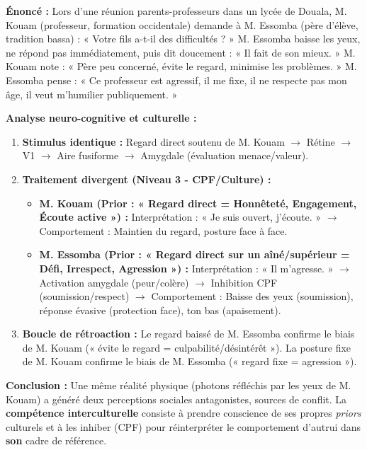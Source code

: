 \documentclass[11pt]{article}
\begin{document}
\begin{exoresolu}
\textbf{Énoncé :} Lors d'une réunion parents-professeurs dans un lycée de Douala, M. Kouam (professeur, formation occidentale) demande à M. Essomba (père d'élève, tradition bassa) : « Votre fils a-t-il des difficultés ? » M. Essomba baisse les yeux, ne répond pas immédiatement, puis dit doucement : « Il fait de son mieux. » M. Kouam note : « Père peu concerné, évite le regard, minimise les problèmes. » M. Essomba pense : « Ce professeur est agressif, il me fixe, il ne respecte pas mon âge, il veut m'humilier publiquement. »

\textbf{Analyse neuro-cognitive et culturelle :}
\begin{enumerate}
    \item \textbf{Stimulus identique :} Regard direct soutenu de M. Kouam $\to$ Rétine $\to$ V1 $\to$ Aire fusiforme $\to$ Amygdale (évaluation menace/valeur).
    \item \textbf{Traitement divergent (Niveau 3 - CPF/Culture) :}
    \begin{itemize}
        \item \textbf{M. Kouam (Prior : « Regard direct = Honnêteté, Engagement, Écoute active ») :} Interprétation : « Je suis ouvert, j'écoute. » $\to$ Comportement : Maintien du regard, posture face à face.
        \item \textbf{M. Essomba (Prior : « Regard direct sur un aîné/supérieur = Défi, Irrespect, Agression ») :} Interprétation : « Il m'agresse. » $\to$ Activation amygdale (peur/colère) $\to$ Inhibition CPF (soumission/respect) $\to$ Comportement : Baisse des yeux (soumission), réponse évasive (protection face), ton bas (apaisement).
    \end{itemize}
    \item \textbf{Boucle de rétroaction :} Le regard baissé de M. Essomba confirme le biais de M. Kouam (« évite le regard = culpabilité/désintérêt »). La posture fixe de M. Kouam confirme le biais de M. Essomba (« regard fixe = agression »).
\end{enumerate}
\textbf{Conclusion :} Une même réalité physique (photons réfléchis par les yeux de M. Kouam) a généré deux perceptions sociales antagonistes, sources de conflit. La \textbf{compétence interculturelle} consiste à prendre conscience de ses propres \emph{priors} culturels et à les inhiber (CPF) pour réinterpréter le comportement d'autrui dans \textbf{son} cadre de référence.
\end{exoresolu}
\end{document}
